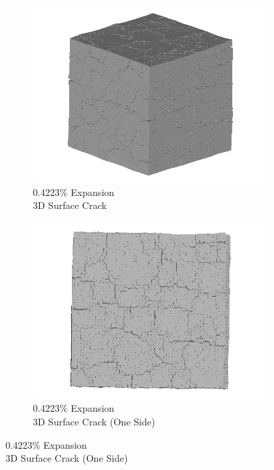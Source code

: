 \begin{figure}[ht!]
    \begin{subfigure}{.5\textwidth}
      \centering
      \includegraphics[width=0.5\linewidth]{Files/exp_3D/ASR/A30P75_3_3d.png}
      \caption{0.4223\% Expansion\\3D Surface Crack}
    \end{subfigure}%
    \begin{subfigure}{.5\textwidth}
      \centering
      \includegraphics[width=0.5\linewidth]{Files/exp_3D/ASR/A30P75_3_3ds.png}
      \caption{0.4223\% Expansion\\3D Surface Crack (One Side)}
    \end{subfigure}%
    

\end{figure}
